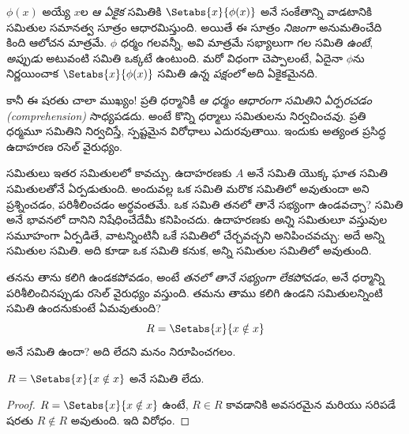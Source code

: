 \documentclass[../../../include/open-logic-section]{subfiles}
\begin{document}

$\phi(x)$ అయ్యే $x$ల \emph{ఆ ఏకైక} సమితికి
$\Setabs{x}{\phi(x)}$ అనే సంకేతాన్ని వాడటానికి సమితుల సమానత్వ
సూత్రం ఆధారమిస్తుంది. అయితే ఈ సూత్రం \emph{నిజంగా}
అనుమతించేది కింది ఆలోచన మాత్రమే. $\phi$ ధర్మం గలవన్నీ,
అవి మాత్రమే సభ్యాలుగా గల సమితి \emph{ఉంటే}, \emph{అప్పుడు}
అటువంటి సమితి ఒక్కటే ఉంటుంది. మరో విధంగా చెప్పాలంటే,
ఏదైనా $\phi$ను నిర్ణయించాక $\Setabs{x}{\phi(x)}$ సమితి
\emph{ఉన్న పక్షంలో} అది ఏకైకమైనది.

కానీ ఈ షరతు చాలా ముఖ్యం!{} ప్రతి ధర్మానికీ
\emph{ఆ ధర్మం ఆధారంగా సమితిని ఏర్పరచడం (comprehension)}
సాధ్యపడదు. అంటే కొన్ని ధర్మాలు సమితులను
నిర్వచించ\emph{వు}. ప్రతి ధర్మమూ సమితిని నిర్వచిస్తే,
స్పష్టమైన విరోధాలు ఎదురవుతాయి. ఇందుకు అత్యంత ప్రసిద్ధ ఉదాహరణ
రసెల్ వైరుధ్యం.

సమితులు ఇతర సమితులలో  కావచ్చు. ఉదాహరణకు
$A$ అనే సమితి యొక్క ఘాత సమితి సమితులతోనే ఏర్పడుతుంది.
అందువల్ల ఒక సమితి మరొక సమితిలో  అవుతుందా అని
ప్రశ్నించడం, పరిశీలించడం అర్థవంతమే. ఒక సమితి తనలో తానే సభ్యంగా
ఉండవచ్చా? సమితి అనే భావనలో దానిని నిషేధించేదేమీ కనిపించదు.
ఉదాహరణకు \emph{అన్ని} సమితులూ వస్తువుల సమూహంగా ఏర్పడితే,
వాటన్నింటినీ ఒకే సమితిలో చేర్చవచ్చని అనిపించవచ్చు: అదే అన్ని
సమితుల సమితి. అది కూడా ఒక సమితి కనుక, అన్ని సమితుల సమితిలో
 అవుతుంది.

తనను తాను  కలిగి ఉండకపోవడం, అంటే
\emph{తనలో తానే సభ్యంగా లేకపోవడం}, అనే ధర్మాన్ని పరిశీలించినప్పుడు
రసెల్ వైరుధ్యం వస్తుంది. తమను తాము  కలిగి ఉండని
సమితులన్నింటి సమితి ఉందనుకుంటే ఏమవుతుంది?
\[
R = \Setabs{x}{x \notin x}
\]
అనే సమితి ఉందా? అది లేదని మనం నిరూపించగలం.

\begin{thm}[రసెల్ వైరుధ్యం]
	$R = \Setabs{x}{x \notin x}$ అనే సమితి లేదు.
\end{thm}

\begin{proof}
$R = \Setabs{x}{x \notin x}$ ఉంటే,
$R \in R$ కావడానికి అవసరమైన మరియు సరిపడే షరతు $R \notin R$
అవుతుంది. ఇది విరోధం.
\end{proof}
\end{document}
